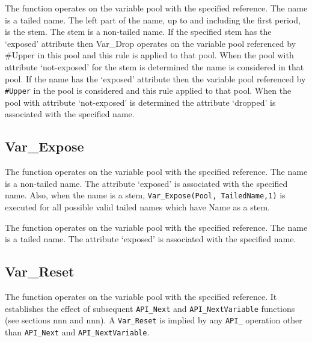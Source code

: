 The function operates on the variable pool with the specified reference.
The name is a tailed name. The left part of the name, up to and
including the first period, is the stem. The stem is a non-tailed name.
If the specified stem has the `exposed' attribute then Var\_Drop
operates on the variable pool referenced by \#Upper in this pool and
this rule is applied to that pool. When the pool with attribute
`not-exposed' for the stem is determined the name is considered in that
pool. If the name has the `exposed' attribute then the variable pool
referenced by \texttt{\#Upper} in the pool is considered and this rule
applied to that pool. When the pool with attribute `not-exposed' is
determined the attribute `dropped' is associated with the specified
name.

\subsection{Var\_Expose}\label{var_expose}



The function operates on the variable pool with the specified reference.
The name is a non-tailed name. The attribute `exposed' is associated
with the specified name. Also, when the name is a stem,
\texttt{Var\_Expose(Pool,\ TailedName,\textquotesingle{}1\textquotesingle{})}
is executed for all possible valid tailed names which have Name as a
stem.



The function operates on the variable pool with the specified reference.
The name is a tailed name. The attribute `exposed' is associated with
the specified name.

\subsection{Var\_Reset}\label{var_reset}



The function operates on the variable pool with the specified reference.
It establishes the effect of subsequent \texttt{API\_Next} and
\texttt{API\_NextVariable} functions (see sections nnn and nnn). A
\texttt{Var\_Reset} is implied by any \texttt{API\_} operation other
than \texttt{API\_Next} and \texttt{API\_NextVariable}.

